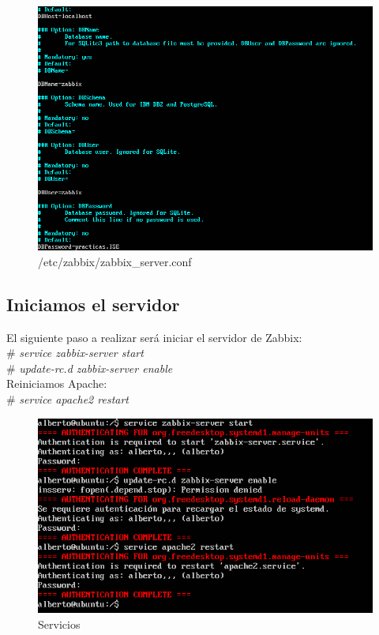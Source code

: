 \begin{figure}[h]
	\centering
	\includegraphics[scale=0.5]{images/4.png}
	\caption{/etc/zabbix/zabbix\_server.conf}
\end{figure}


\subsection{Iniciamos el servidor}

El siguiente paso a realizar será iniciar el servidor de Zabbix: \\
\# \textit{service zabbix-server start} \\
\# \textit{update-rc.d zabbix-server enable}\\

\newpage
Reiniciamos Apache: \\
\# \textit{service apache2 restart} \\

 \begin{figure}[h]
 	\centering
 	\includegraphics[scale=0.5]{images/2.png}
 	\caption{Servicios}
 \end{figure}
 
